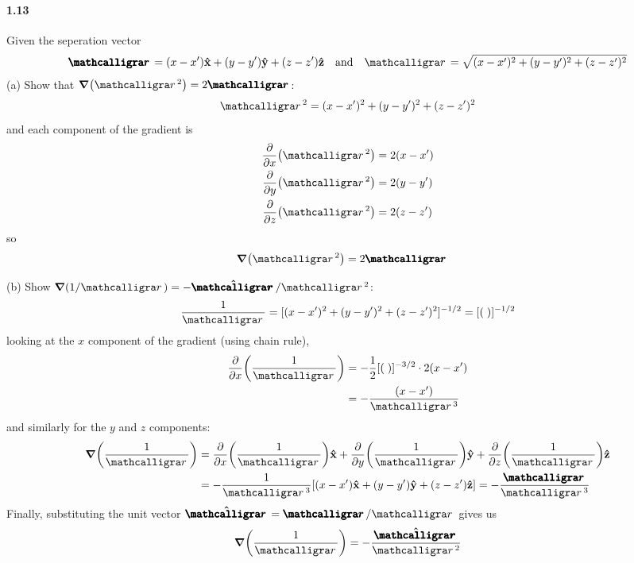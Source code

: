 \documentclass[../main.tex]{subfiles}
\begin{document}
\paragraph{1.13}
Given the seperation vector
\begin{align*}
    \boldscriptr = (x - x') \vu{x} + (y - y') \vu{y} + (z - z') \vu{z} \qand 
    \scriptr = \sqrt{(x - x')^2 + (y - y')^2 + (z - z')^2}
\end{align*}
(a) Show that $\grad(\scriptr^2) = 2 \boldscriptr$:
\begin{align*}
    \scriptr^2 = (x - x')^2 + (y - y')^2 + (z - z')^2 
\end{align*}
and each component of the gradient is
\begin{align*}
    \pdv{x}(\scriptr^2) &= 2(x - x') \\
    \pdv{y}(\scriptr^2) &= 2(y - y') \\
    \pdv{z}(\scriptr^2) &= 2(z - z')
\end{align*}
so
\begin{align*}
    \grad(\scriptr^2) &= 2 \boldscriptr
\end{align*}

(b) Show $\grad(1/\scriptr) = -\vu*{\boldscriptr}/\scriptr^2$:
\begin{align*}
    \frac{1}{\scriptr} = [(x - x')^2 + (y - y')^2 + (z - z')^2]^{-1/2} = [(\;)]^{-1/2}
\end{align*}
looking at the $x$ component of the gradient (using chain rule),
\begin{align*}
    \pdv{x}(\frac{1}{\scriptr}) &= -\frac{1}{2} [(\;)]^{-3/2} \cdot 2(x - x') \\
    &= -\frac{(x - x')}{\scriptr^3}
\end{align*}
and similarly for the $y$ and $z$ components:
\begin{align*}
    \grad(\frac{1}{\scriptr}) &= \pdv{x}(\frac{1}{\scriptr}) \vu{x}
        + \pdv{y}(\frac{1}{\scriptr}) \vu{y} + \pdv{z}(\frac{1}{\scriptr}) \vu{z} \\
    &= -\frac{1}{\scriptr^3}
        [(x - x') \vu{x} + (y - y') \vu{y} + (z - z') \vu{z}]
    = -\frac{\boldscriptr}{\scriptr^3}
\end{align*}
Finally, substituting the unit vector $\vu{\boldscriptr} = \boldscriptr/\scriptr$ gives us
\begin{align*}
    \grad(\frac{1}{\scriptr}) = -\frac{\vu*{\boldscriptr}}{\scriptr^2}
\end{align*}
\end{document}
